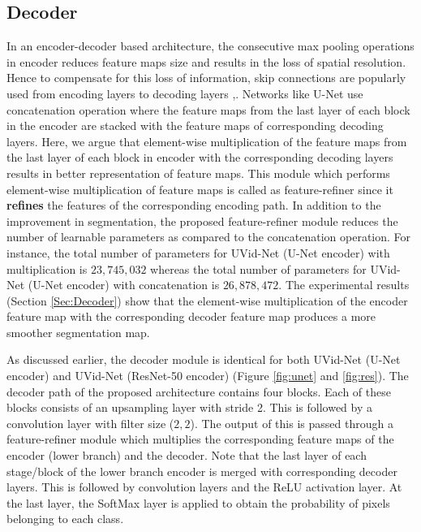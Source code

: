 \documentclass[journal]{IEEEtran}
\begin{document}
\subsection{Decoder} 
\label{SubSec:Decoder}
\par  
In an encoder-decoder based architecture, the consecutive max pooling operations in encoder reduces feature maps size and results in the loss of spatial resolution. Hence to compensate for this loss of information, skip connections are popularly used from encoding layers to decoding layers \cite{2},\cite{4}. Networks like U-Net use concatenation operation where the feature maps from the last layer of each block in the encoder are stacked with the feature maps of corresponding decoding layers. Here, we argue that element-wise multiplication of the feature maps from the last layer of each block in encoder with the corresponding decoding layers results in better representation of feature maps. This module which performs element-wise multiplication of feature maps is called as feature-refiner since it \textbf{refines} the features of the corresponding encoding path. In addition to the improvement in segmentation, the proposed feature-refiner module reduces the number of learnable parameters as compared to the concatenation operation.  For instance, the total number of parameters for UVid-Net (U-Net encoder) with multiplication is $23,745,032$ whereas the total number of parameters for UVid-Net (U-Net encoder) with concatenation is $26,878,472$. The experimental results (Section \ref{Sec:Decoder}) show that the element-wise multiplication of the encoder feature map with the corresponding decoder feature map produces a more smoother segmentation map.


As discussed earlier, the decoder module is identical for both UVid-Net (U-Net encoder) and UVid-Net (ResNet-50 encoder) (Figure \ref{fig:unet} and \ref{fig:res}). The decoder path of the proposed architecture contains four blocks. Each of these blocks consists of an upsampling layer with stride 2. This is followed by a convolution layer with filter size ($2,2$). The output of this is passed through a feature-refiner module which multiplies the corresponding feature maps of the encoder (lower branch) and the decoder. Note that the last layer of each stage/block of the lower branch encoder is merged with corresponding decoder layers.  This is followed by convolution layers and the ReLU activation layer. At the last layer, the SoftMax layer is applied to obtain the probability of pixels belonging to each class. 
\end{document}
